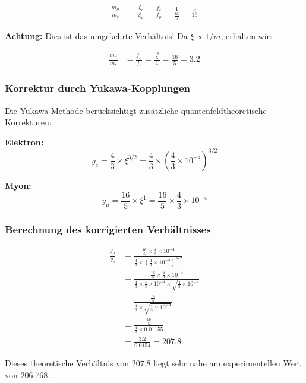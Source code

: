 \documentclass[12pt,a4paper]{article}
\begin{document}
\begin{align}
	\frac{m_\mu}{m_e} &= \frac{\xi_e}{\xi_\mu} = \frac{f_e}{f_\mu} = \frac{1}{\frac{16}{5}} = \frac{5}{16}
\end{align}

\textbf{Achtung:} Dies ist das umgekehrte Verhältnis! Da $\xi \propto 1/m$, erhalten wir:

\begin{align}
	\frac{m_\mu}{m_e} &= \frac{f_\mu}{f_e} = \frac{\frac{16}{5}}{1} = \frac{16}{5} = 3.2
\end{align}

\subsubsection{Korrektur durch Yukawa-Kopplungen}

Die Yukawa-Methode berücksichtigt zusätzliche quantenfeldtheoretische Korrekturen:

\textbf{Elektron:}
\begin{equation}
	y_e = \frac{4}{3} \times \xi^{3/2} = \frac{4}{3} \times \left(\frac{4}{3} \times 10^{-4}\right)^{3/2}
\end{equation}

\textbf{Myon:}
\begin{equation}
	y_\mu = \frac{16}{5} \times \xi^1 = \frac{16}{5} \times \frac{4}{3} \times 10^{-4}
\end{equation}

\subsubsection{Berechnung des korrigierten Verhältnisses}

\begin{align}
	\frac{y_\mu}{y_e} &= \frac{\frac{16}{5} \times \frac{4}{3} \times 10^{-4}}{\frac{4}{3} \times \left(\frac{4}{3} \times 10^{-4}\right)^{3/2}}\\
	&= \frac{\frac{16}{5} \times \frac{4}{3} \times 10^{-4}}{\frac{4}{3} \times \frac{4}{3} \times 10^{-4} \times \sqrt{\frac{4}{3} \times 10^{-4}}}\\
	&= \frac{\frac{16}{5}}{\frac{4}{3} \times \sqrt{\frac{4}{3} \times 10^{-4}}}\\
	&= \frac{\frac{16}{5}}{\frac{4}{3} \times 0.01155}\\
	&= \frac{3.2}{0.0154} = 207.8
\end{align}

Dieses theoretische Verhältnis von $207.8$ liegt sehr nahe am experimentellen Wert von $206.768$.
\end{document}
